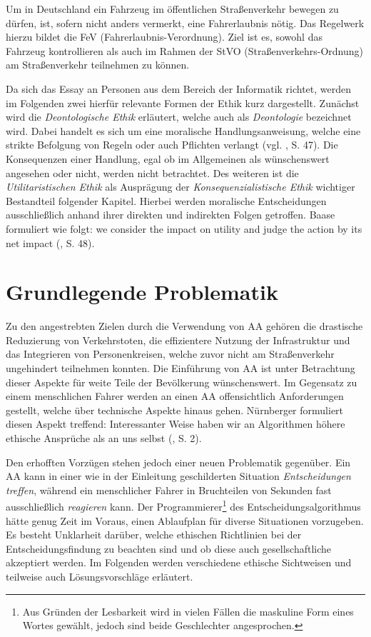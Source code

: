 \documentclass[a4paper, 12pt, titlepage]{scrartcl}
\begin{document}
	Um in Deutschland ein Fahrzeug im \"offentlichen Stra\ss enverkehr bewegen zu d\"urfen, ist, sofern nicht anders vermerkt, eine Fahrerlaubnis n\"otig. Das Regelwerk hierzu bildet die FeV (Fahrerlaubnis-Verordnung). Ziel ist es, sowohl das Fahrzeug kontrollieren als auch im Rahmen der StVO (Stra\ss enverkehrs-Ordnung) am Stra\ss enverkehr teilnehmen zu k\"onnen.
	
	Da sich das Essay an Personen aus dem Bereich der Informatik richtet, werden im Folgenden zwei hierf\"ur relevante Formen der Ethik kurz dargestellt. Zun\"achst wird die \emph{Deontologische Ethik} erl\"autert, welche auch als \emph{Deontologie} bezeichnet wird. Dabei handelt es sich um eine moralische Handlungsanweisung, welche eine strikte Befolgung von Regeln oder auch Pflichten verlangt (vgl. \autocite{baase:fire}, S. 47). Die Konsequenzen einer Handlung, egal ob im Allgemeinen als w\"unschenswert angesehen oder nicht, werden nicht betrachtet. Des weiteren ist die \emph{Utilitaristischen Ethik} als Auspr\"agung der \emph{Konsequenzialistische Ethik} wichtiger Bestandteil folgender Kapitel. Hierbei werden moralische Entscheidungen ausschlie\ss lich anhand ihrer direkten und indirekten Folgen getroffen. Baase \autocite{baase:fire} formuliert wie folgt: \glqq we consider the impact on utility and judge the action by its net impact\grqq{} (\autocite{baase:fire}, S. 48).
\section{Grundlegende Problematik}
	Zu den angestrebten Zielen durch die Verwendung von AA geh\"oren die drastische Reduzierung von Verkehrstoten, die effizientere Nutzung der Infrastruktur und das Integrieren von Personenkreisen, welche zuvor nicht am Stra\ss enverkehr ungehindert teilnehmen konnten. Die Einf\"uhrung von AA ist unter Betrachtung dieser Aspekte f\"ur weite Teile der Bev\"olkerung w\"unschenswert. Im Gegensatz zu einem menschlichen Fahrer werden an einen AA offensichtlich Anforderungen gestellt, welche \"uber technische Aspekte hinaus gehen. N\"urnberger \autocite{nunu2016} formuliert diesen Aspekt treffend: \glqq Interessanter Weise haben wir an Algorithmen höhere ethische Ansprüche als an uns selbst\grqq{} (\cite{nunu2016}, S. 2).
	
	Den erhofften Vorz\"ugen stehen jedoch einer neuen Problematik gegen\"uber. Ein AA kann in einer wie in der Einleitung geschilderten Situation \emph{Entscheidungen treffen}, w\"ahrend ein menschlicher Fahrer in Bruchteilen von Sekunden fast ausschlie\ss lich \emph{reagieren} kann. Der Programmierer\footnote{Aus Gr\"unden der Lesbarkeit wird in vielen F\"allen die maskuline Form eines Wortes gew\"ahlt, jedoch sind beide Geschlechter angesprochen.} des Entscheidungsalgorithmus h\"atte genug Zeit im Voraus, einen Ablaufplan f\"ur diverse Situationen vorzugeben. Es besteht Unklarheit dar\"uber, welche ethischen Richtlinien bei der Entscheidungsfindung zu beachten sind und ob diese auch gesellschaftliche akzeptiert werden. Im Folgenden werden verschiedene ethische Sichtweisen und teilweise auch L\"osungsvorschl\"age erl\"autert.   
\end{document}
